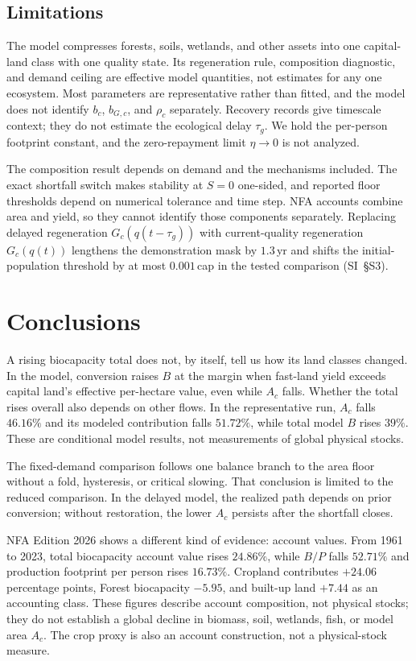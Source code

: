 \documentclass[preprint,12pt,authoryear]{elsarticle}
\begin{document}
\subsection{Limitations}

The model compresses forests, soils, wetlands, and other assets into one capital-land class with one quality state. Its regeneration rule, composition diagnostic, and demand ceiling are effective model quantities, not estimates for any one ecosystem. Most parameters are representative rather than fitted, and the model does not identify $b_c$, $b_{G,c}$, and $\rho_c$ separately. Recovery records give timescale context; they do not estimate the ecological delay $\tau_g$. We hold the per-person footprint constant, and the zero-repayment limit $\eta\to0$ is not analyzed.

The composition result depends on demand and the mechanisms included. The exact shortfall switch makes stability at $S=0$ one-sided, and reported floor thresholds depend on numerical tolerance and time step. NFA accounts combine area and yield, so they cannot identify those components separately. Replacing delayed regeneration $G_c(q(t-\tau_g))$ with current-quality regeneration $G_c(q(t))$ lengthens the demonstration mask by $1.3$\,yr and shifts the initial-population threshold by at most $0.001$\,cap in the tested comparison (SI~\S S3).

\section{Conclusions}\label{sec:conclusions}

A rising biocapacity total does not, by itself, tell us how its land classes changed. In the model, conversion raises $B$ at the margin when fast-land yield exceeds capital land's effective per-hectare value, even while $A_c$ falls. Whether the total rises overall also depends on other flows. In the representative run, $A_c$ falls $46.16\%$ and its modeled contribution falls $51.72\%$, while total model $B$ rises $39\%$. These are conditional model results, not measurements of global physical stocks.

The fixed-demand comparison follows one balance branch to the area floor without a fold, hysteresis, or critical slowing. That conclusion is limited to the reduced comparison. In the delayed model, the realized path depends on prior conversion; without restoration, the lower $A_c$ persists after the shortfall closes.

NFA Edition 2026 shows a different kind of evidence: account values. From 1961 to 2023, total biocapacity account value rises $24.86\%$, while $B/P$ falls $52.71\%$ and production footprint per person rises $16.73\%$. Cropland contributes $+24.06$ percentage points, Forest biocapacity $-5.95$, and built-up land $+7.44$ as an accounting class. These figures describe account composition, not physical stocks; they do not establish a global decline in biomass, soil, wetlands, fish, or model area $A_c$. The crop proxy is also an account construction, not a physical-stock measure.
\end{document}
